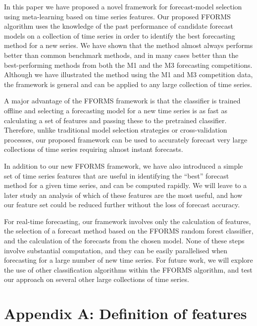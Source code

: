 \documentclass[11pt,a4paper,]{article}
\begin{document}
In this paper we have proposed a novel framework for forecast-model selection using meta-learning based on time series features. Our proposed FFORMS algorithm uses the knowledge of the past performance of candidate forecast models on a collection of time series in order to identify the best forecasting method for a new series. We have shown that the method almost always performs better than common benchmark methods, and in many cases better than the best-performing methods from both the M1 and the M3 forecasting competitions. Although we have illustrated the method using the M1 and M3 competition data, the framework is general and can be applied to any large collection of time series.

A major advantage of the FFORMS framework is that the classifier is trained offline and selecting a forecasting model for a new time series is as fast as calculating a set of features and passing these to the pretrained classifier. Therefore, unlike traditional model selection strategies or cross-validation processes, our proposed framework can be used to accurately forecast very large collections of time series requiring almost instant forecasts.

In addition to our new FFORMS framework, we have also introduced a simple set of time series features that are useful in identifying the ``best'' forecast method for a given time series, and can be computed rapidly. We will leave to a later study an analysis of which of these features are the most useful, and how our feature set could be reduced further without the loss of forecast accuracy.

For real-time forecasting, our framework involves only the calculation of features, the selection of a forecast method based on the FFORMS random forest classifier, and the calculation of the forecasts from the chosen model. None of these steps involve substantial computation, and they can be easily parallelised when forecasting for a large number of new time series. For future work, we will explore the use of other classification algorithms within the FFORMS algorithm, and test our approach on several other large collections of time series.

\hypertarget{appendix-a-definition-of-features}{%
\section*{Appendix A: Definition of features}\label{appendix-a-definition-of-features}}
\end{document}
